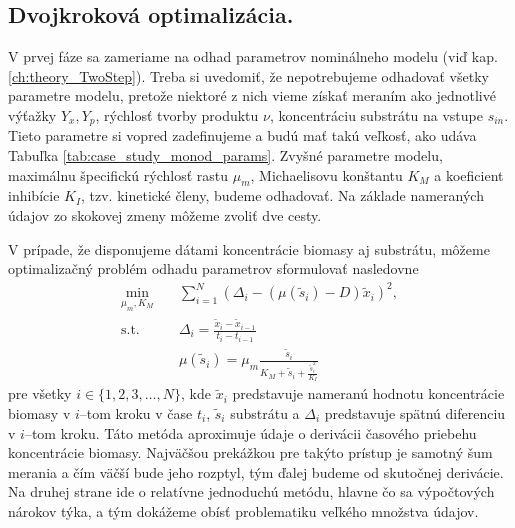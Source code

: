 \subsection*{Dvojkroková optimalizácia.}
V prvej fáze sa zameriame na odhad parametrov nominálneho modelu (viď kap. \ref{ch:theory_TwoStep}). Treba si uvedomiť, že nepotrebujeme odhadovať všetky parametre modelu, pretože niektoré z nich vieme získať meraním ako jednotlivé výťažky $ Y_{x}, Y_{p} $, rýchlosť tvorby produktu $ \nu $, koncentráciu substrátu na vstupe $ s_{in} $. Tieto parametre si vopred zadefinujeme a budú mať takú veľkosť, ako udáva Tabuľka \ref{tab:case_study_monod_params}. Zvyšné parametre modelu, maximálnu špecifickú rýchlosť rastu $ \mu_{m} $, Michaelisovu konštantu $ K_{M} $ a koeficient inhibície $ K_{I} $, tzv. kinetické členy, budeme odhadovať. Na základe nameraných údajov zo skokovej zmeny môžeme zvoliť dve cesty.

V prípade, že disponujeme dátami koncentrácie biomasy aj substrátu, môžeme optimalizačný problém odhadu parametrov sformulovať nasledovne
\begin{equation}
\label{eq:twostep_der_app}
	\begin{split}
		\min_{\mu_{m},K_{M}} \quad &\sum_{i=1}^{N} \left(\Delta_{i} - \left(\mu(\tilde{s}_{i}) - D\right)\tilde{x}_{i}\right)^2, \\
		\text{s.t.} \quad &\Delta_{i} = \frac{\tilde{x}_{i} - \tilde{x}_{i-1}}{t_{i} - t_{i-1}} \\
		\quad &\mu(\tilde{s}_{i})=\mu_{m}\frac{\tilde{s}_{i}}{K_{M} + \tilde{s}_{i} + \frac{\tilde{s}_{i}^2}{K_{I}}}
	\end{split}
\end{equation} 
pre všetky $ i \in \lbrace 1,2,3,\dots,N \rbrace $, kde $ \tilde{x}_{i} $ predstavuje nameranú hodnotu koncentrácie biomasy v $ i $--tom kroku v čase $ t_i $, $ \tilde{s}_{i} $ substrátu a $ \Delta_{i} $ predstavuje spätnú diferenciu v $ i $--tom kroku. Táto metóda aproximuje údaje o derivácii časového priebehu koncentrácie biomasy. Najväčšou prekážkou pre takýto prístup je samotný šum merania a čím väčší bude jeho rozptyl, tým ďalej budeme od skutočnej derivácie. Na druhej strane ide o relatívne jednoduchú metódu, hlavne čo sa výpočtových nárokov týka, a tým dokážeme obísť problematiku veľkého množstva údajov.

